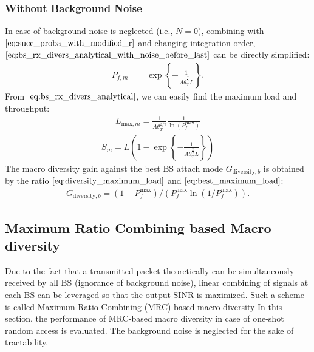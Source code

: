 \subsubsection{Without Background Noise}
In case of background noise is neglected (i.e., $N=0$), combining with $\eqref{eq:succ_proba_with_modified_r}$ and changing integration order, $\eqref{eq:bs_rx_divers_analytical_with_noise_before_last}$ can be directly simplified:
\begin{align}
	\label{eq:bs_rx_divers_analytical}
	P_{f,m} 
	&= \exp\left\lbrace -\frac{1}{A \theta_{T}^{\frac{2}{\gamma}} L }\right\rbrace.
\end{align}
From $\eqref{eq:bs_rx_divers_analytical}$, we can easily find the maximum load and throughput:
\begin{align}
	\label{eq:diversity_maximum_load}
	L_{\text{max}, m} = \frac{1}{A \theta_{T}^{2/\gamma}} \frac{1}{\ln(P_{f}^{\textbf{max}})}
\end{align}
\begin{align}
	S_{m} = L \left( 1 - \exp\left\lbrace -\frac{1}{A \theta_{T}^{\frac{2}{\gamma}} L }\right\rbrace \right) 
\end{align}
The macro diversity gain against the best BS attach mode $G_{\text{diversity}, b}$ is obtained by the ratio $\eqref{eq:diversity_maximum_load}$ and $\eqref{eq:best_maximum_load}$:
\begin{align}
	G_{\text{diversity}, b} = (1 - P_{f}^{\text{max}}) / \left( P_{f}^{\text{max}} \ln(1/P_{f}^{\text{max}})\right). 
\end{align}

\subsection{Maximum Ratio Combining based Macro diversity}
Due to the fact that a transmitted packet theoretically can be simultaneously received by all BS (ignorance of background noise), linear combining of signals at each BS can be leveraged so that the output SINR is maximized. Such a scheme is called Maximum Ratio Combining (MRC) based macro diversity
In this section, the performance of MRC-based macro diversity in case of one-shot random access is evaluated. The background noise is neglected for the sake of tractability.

